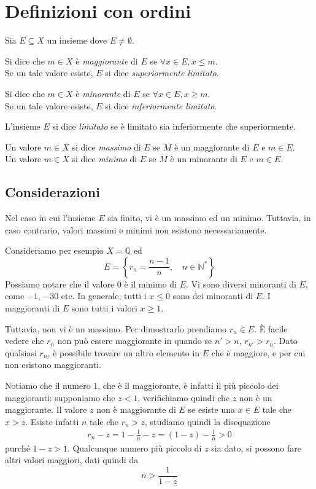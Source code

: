 \documentclass[a4paper]{article}
\begin{document}
\pagebreak 

\section{Definizioni con ordini}

Sia \(E \subseteq X\) un insieme dove \(E \neq \emptyset\).

Si dice che \(m\in X\) è \textit{maggiorante} di \(E\) se \(\forall x \in E, x \leq m\). \\
Se un tale valore esiste, \(E\) si dice \textit{superiormente limitato}.

Si dice che \(m\in X\) è \textit{minorante} di \(E\) se \(\forall x \in E, x \geq m\). \\
Se un tale valore esiste, \(E\) si dice \textit{inferiormente limitato}.

L'insieme \(E\) si dice \textit{limitato} se è limitato sia inferiormente che superiormente.

Un valore \(m\in X\) si dice \textit{massimo} di \(E\) se \(M\) è un maggiorante di \(E\) e \(m\in E\). \\
Un valore \(m\in X\) si dice \textit{minimo} di \(E\) se \(M\) è un minorante di \(E\) e \(m\in E\).

\subsection{Considerazioni}

Nel caso in cui l'insieme \(E\) sia finito, vi è un massimo ed un minimo.
Tuttavia, in caso contrario, valori massimi e minimi non esistono necessariamente.

Consideriamo per esempio \(X=\mathbb{Q}\) ed
\[
    E = \left\{ r_n = \frac{n-1}{n}, \quad n\in{\mathbb{N}}^* \right\}
\]
Possiamo notare che il valore \(0\) è il minimo di \(E\).
Vi sono diversi minoranti di \(E\), come \(-1\), \(-30\) etc. In generale, tutti i \(x\leq 0\) sono
dei minoranti di \(E\).
I maggioranti di \(E\) sono tutti i valori \( x \geq 1\).

Tuttavia, non vi è un massimo. Per dimostrarlo prendiamo \(r_n \in E\).
È facile vedere che \(r_n\) non può essere maggiorante in quando se \(n'>n\), \(r_{n'}>r_n\).
Dato qualsiasi \(r_n\), è possibile trovare un altro elemento in \(E\) che è maggiore, e per cui non
esistono maggioranti.

Notiamo che il numero \(1\), che è il maggiorante, è infatti il più piccolo dei maggioranti:
supponiamo che \(z<1\), verifichiamo quindi che \(z\) non è un maggiorante.
Il valore \(z\) non è maggiorante di \(E\) se esiste una \(x \in E\) tale che \(x > z\).
Esiste infatti \(n\) tale che \(r_n > z\), studiamo quindi la disequazione
\begin{align*}
    r_n - z = 1 - \frac{1}{n} - z = (1-z) - \frac{1}{n} > 0
\end{align*}
purché \(1-z>1\). Qualcunque numero più piccolo di \(z\) sia dato, si possono fare
altri valori maggiori, dati quindi da
\[
    n > \frac{1}{1-z}
\]
\end{document}
